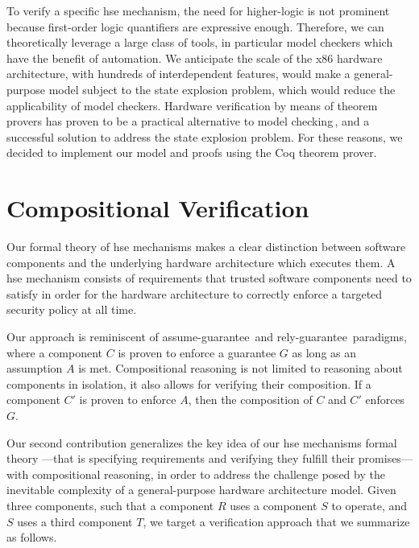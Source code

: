 To verify a specific \ac{hse} mechanism, the need for higher-logic is not
prominent because first-order logic quantifiers are expressive enough.
%
Therefore, we can theoretically leverage a large class of tools, in particular
model checkers which have the benefit of automation.
%
We anticipate the scale of the x86 hardware architecture, with hundreds of
interdependent features, would make a general-purpose model subject to the state
explosion problem, which would reduce the applicability of model checkers.
%
Hardware verification by means of theorem provers has proven to be a practical
alternative to model checking\,\cite{vijayaraghavan2015modular,choi2017kami},
and a successful solution to address the state explosion problem.
%
For these reasons, we decided to implement our model and proofs using the Coq
theorem prover.

\section{Compositional Verification}
\label{section:sota:compsec}

Our formal theory of \ac{hse} mechanisms makes a clear distinction between
software components and the underlying hardware architecture which executes
them.
%
A \ac{hse} mechanism consists of requirements that trusted software components
need to satisfy in order for the hardware architecture to correctly enforce a
targeted security policy at all time.

Our approach is reminiscent of assume-guarantee\,\cite{pnueli1985ag} and
rely-guarantee\,\cite{jones1983tentative} paradigms, where a component \( C \)
is proven to enforce a guarantee \( G \) as long as an assumption \( A \) is
met.
%
Compositional reasoning is not limited to reasoning about components in
isolation, it also allows for verifying their composition.
%
If a component \( C' \) is proven to enforce \( A \), then the composition of
\( C \) and \( C' \) enforces \( G \).

Our second contribution generalizes the key idea of our \ac{hse} mechanisms
formal theory ---that is specifying requirements and verifying they fulfill
their promises--- with compositional reasoning, in order to address the
challenge posed by the inevitable complexity of a general-purpose hardware
architecture model.
%
Given three components, such that a component \( R \) uses a component \( S \)
to operate, and \( S \) uses a third component \( T \), we target a verification
approach that we summarize as follows.

